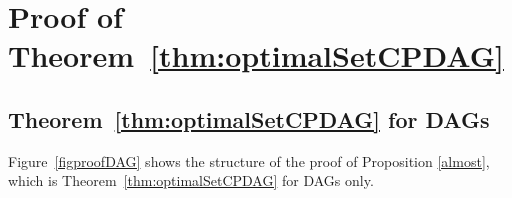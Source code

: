 \documentclass[11pt,a4paper]{article}
\theoremstyle{definition}
\theoremstyle{remark}
\newcommand{\g}[1][G]{\mathcal{#1}}
\begin{document}
%	




\section{Proof of Theorem~\ref{thm:optimalSetCPDAG}}
\label{section-E}

\subsection{Theorem~\ref{thm:optimalSetCPDAG} for DAGs}

Figure~\ref{figproofDAG} shows the structure of the proof of Proposition \ref{almost}, which is Theorem~\ref{thm:optimalSetCPDAG} for DAGs only.
\end{document}

